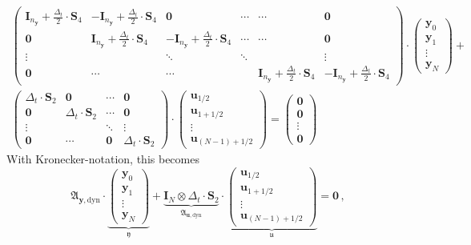 \documentclass{article}
\newcommand{\kron}{\otimes}%
\newcommand{\vectorfont}[1]{\boldsymbol{#1}}%
\newcommand{\greekvectorfont}[1]{\boldsymbol{#1}}%
\newcommand{\matrixfont}[1]{\mathbf{#1}}%
\newcommand{\uvec}{\vectorfont{u}}
\newcommand{\yvec}{\vectorfont{y}}
\newcommand{\ufrakvec}{\vectorfont{\mathfrak{u}}}
\newcommand{\yfrakvec}{\vectorfont{\mathfrak{y}}}
\newcommand{\nullvec}{\greekvectorfont{0}}
\newcommand{\Imat}{\matrixfont{I}}%
\newcommand{\Smat}{\matrixfont{S}}
\newcommand{\Afrakmat}{\matrixfont{\mathfrak{A}}}
\newcommand{\Nullmat}{\matrixfont{0}}
\begin{document}
{\small
\begin{multline*}
\begin{pmatrix}
\Imat_{n_{\yvec}}+\frac{\Delta_t}{2}\cdot \Smat_4 & -\Imat_{n_{\yvec}}+\frac{\Delta_t}{2}\cdot \Smat_4 
  & \Nullmat           & \cdots & \cdots & \Nullmat \\
\Nullmat          & \Imat_{n_{\yvec}}+\frac{\Delta_t}{2}\cdot \Smat_4  & -\Imat_{n_{\yvec}}+\frac{\Delta_t}{2}\cdot \Smat_4 & \cdots & \cdots & \Nullmat \\
\vdots            &                    & \ddots             & \ddots &        & \vdots \\
\Nullmat          & \cdots             & \cdots             & &\Imat_{n_{\yvec}}+\frac{\Delta_t}{2}\cdot \Smat_4 & -\Imat_{n_{\yvec}}+\frac{\Delta_t}{2}\cdot \Smat_4
\end{pmatrix}
\cdot
\begin{pmatrix}
	\yvec_0 \\ \yvec_1 \\ \vdots \\ \yvec_N
\end{pmatrix}
+
\\
\begin{pmatrix}
	\Delta_t \cdot \Smat_2 & \Nullmat               & \cdots   & \Nullmat \\
	\Nullmat               & \Delta_t \cdot \Smat_2 & \cdots   & \Nullmat \\
	\vdots                 &                        & \ddots   & \vdots   \\
	\Nullmat               & \cdots                 & \Nullmat & \Delta_t \cdot \Smat_2
\end{pmatrix}
\cdot
\begin{pmatrix}
	\uvec_{1/2} \\ \uvec_{1+1/2} \\ \vdots \\ \uvec_{(N-1)+1/2}
\end{pmatrix}
=
\begin{pmatrix}
	\nullvec \\
	\nullvec \\
	\vdots \\
	\nullvec 
\end{pmatrix}
\end{multline*}
}
With Kronecker-notation, this becomes
\[
\Afrakmat_{\yvec,\mathrm{dyn}}
\cdot 
\underbrace{
\begin{pmatrix}
	\yvec_0 \\ \yvec_1 \\ \vdots \\ \yvec_N
\end{pmatrix}
}_{\yfrakvec}
+
\underbrace{
\Imat_{N} \kron \Delta_t \cdot \Smat_2
}_{\Afrakmat_{\uvec, \mathrm{dyn}}}
\cdot
\underbrace{
\begin{pmatrix}
	\uvec_{1/2} \\ \uvec_{1+1/2} \\ \vdots \\ \uvec_{(N-1)+1/2}
\end{pmatrix}
}_{\ufrakvec}
= \nullvec\,,
\]
\end{document}
